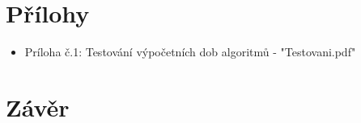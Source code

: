 \documentclass[a4paper, 12pt]{article}
\begin{document}
\clearpage

\section{Přílohy}

\begin{itemize}
	\item Príloha č.1: Testování výpočetních dob algoritmů - "Testovani.pdf"
\end{itemize}
\clearpage
\section{Závěr}
\end{document}
